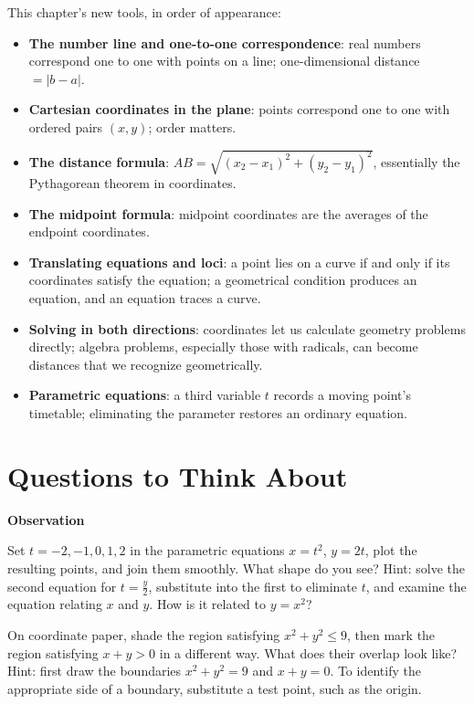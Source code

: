 \begin{toolbox}
This chapter's new tools, in order of appearance:

\begin{itemize}
\item \textbf{The number line and one-to-one correspondence}: real numbers correspond one to one with points on a line; one-dimensional distance $=\lvert b-a\rvert$.
\item \textbf{Cartesian coordinates in the plane}: points correspond one to one with ordered pairs $(x,y)$; order matters.
\item \textbf{The distance formula}: $AB=\sqrt{(x_{2}-x_{1})^{2}+(y_{2}-y_{1})^{2}}$, essentially the Pythagorean theorem in coordinates.
\item \textbf{The midpoint formula}: midpoint coordinates are the averages of the endpoint coordinates.
\item \textbf{Translating equations and loci}: a point lies on a curve if and only if its coordinates satisfy the equation; a geometrical condition produces an equation, and an equation traces a curve.
\item \textbf{Solving in both directions}: coordinates let us calculate geometry problems directly; algebra problems, especially those with radicals, can become distances that we recognize geometrically.
\item \textbf{Parametric equations}: a third variable $t$ records a moving point's timetable; eliminating the parameter restores an ordinary equation.
\end{itemize}
\end{toolbox}

\section*{Questions to Think About}

\textbf{Observation}

\begin{sikao}
\item Set $t=-2,-1,0,1,2$ in the parametric equations $x=t^{2}$, $y=2t$, plot the resulting points, and join them smoothly. What shape do you see? Hint: solve the second equation for $t=\frac{y}{2}$, substitute into the first to eliminate $t$, and examine the equation relating $x$ and $y$. How is it related to $y=x^{2}$?
\item On coordinate paper, shade the region satisfying $x^{2}+y^{2}\le 9$, then mark the region satisfying $x+y>0$ in a different way. What does their overlap look like? Hint: first draw the boundaries $x^{2}+y^{2}=9$ and $x+y=0$. To identify the appropriate side of a boundary, substitute a test point, such as the origin.
\end{sikao}

